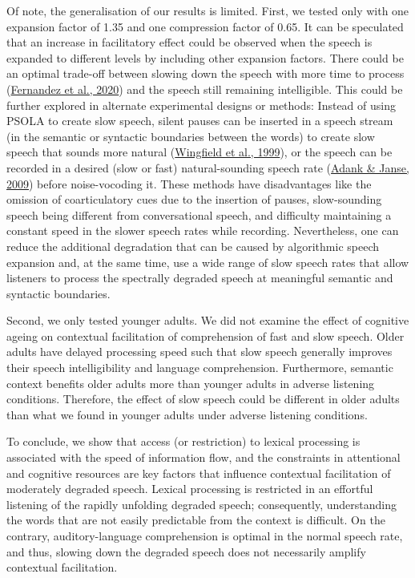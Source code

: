 \documentclass[a4paper, nobind]{templates/ociamthesis}
\begin{document}
Of note, the generalisation of our results is limited. First, we tested only with one expansion factor of 1.35 and one compression factor of 0.65.
It can be speculated that an increase in facilitatory effect could be observed when the speech is expanded to different levels by including other expansion factors.
There could be an optimal trade-off between slowing down the speech with more time to process (\protect\hyperlink{ref-Fernandez2020}{Fernandez et al., 2020}) and the speech still remaining intelligible.
This could be further explored in alternate experimental designs or methods:
Instead of using PSOLA to create slow speech, silent pauses can be inserted in a speech stream (in the semantic or syntactic boundaries between the words) to create slow speech that sounds more natural (\protect\hyperlink{ref-Wingfield1999}{Wingfield et al., 1999}),
or the speech can be recorded in a desired (slow or fast) natural-sounding speech rate (\protect\hyperlink{ref-Adank2009}{Adank \& Janse, 2009}) before noise-vocoding it.
These methods have disadvantages like the omission of coarticulatory cues due to the insertion of pauses, slow-sounding speech being different from conversational speech, and difficulty maintaining a constant speed in the slower speech rates while recording.
Nevertheless, one can reduce the additional degradation that can be caused by algorithmic speech expansion and, at the same time, use a wide range of slow speech rates that allow listeners to process the spectrally degraded speech at meaningful semantic and syntactic boundaries.

Second, we only tested younger adults.
We did not examine the effect of cognitive ageing on contextual facilitation of comprehension of fast and slow speech.
Older adults have delayed processing speed such that slow speech generally improves their speech intelligibility and language comprehension.
Furthermore, semantic context benefits older adults more than younger adults in adverse listening conditions.
Therefore, the effect of slow speech could be different in older adults than what we found in younger adults under adverse listening conditions.

To conclude, we show that access (or restriction) to lexical processing is associated with the speed of information flow, and the constraints in attentional and cognitive resources are key factors that influence contextual facilitation of moderately degraded speech.
Lexical processing is restricted in an effortful listening of the rapidly unfolding degraded speech;
consequently, understanding the words that are not easily predictable from the context is difficult.
On the contrary, auditory-language comprehension is optimal in the normal speech rate, and thus, slowing down the degraded speech does not necessarily amplify contextual facilitation.
\end{document}
